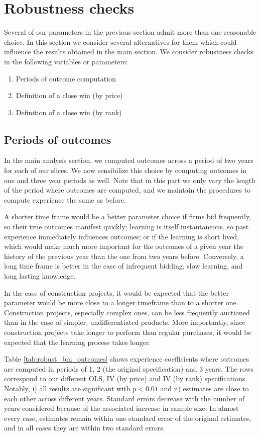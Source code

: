 \section{Robustness checks}
Several of our parameters in the previous section admit more than one reasonable choice. In this section we consider several alternatives for them which could influence the results obtained in the main section. We consider robustness checks in the following variables or parameters:
\begin{enumerate}
  \item Periods of outcome computation
  \item Definition of a close win (by price)
  \item Definition of a close win (by rank)
\end{enumerate}
\subsection{Periods of outcomes}
In the main analysis section, we computed outcomes across a period of two years for each of our slices. We now sensibilize this choice by computing outcomes in one and three year periods as well. Note that in this part we only vary the length of the period where outcomes are computed, and we maintain the procedures to compute experience the same as before.

 A shorter time frame would be a better parameter choice if firms bid frequently, so their true outcomes manifest quickly;  learning is itself instantaneous,  so past experience immediately influences outcomes; or if the learning is short lived, which would make much more important for the outcomes of a given year the history of the previous year than the one from two years before. Conversely, a long time frame is better in the case of infrequent bidding, slow learning, and long lasting knowledge.

In the case of construction projects, it would be expected that the better parameter would be more close to a longer timeframe than to a shorter one. Construction projects, especially complex ones, can be less frequently auctioned than in the case of simpler, undifferentiated products. More importantly, since construction projects take longer to perform than regular purchases, it would be expected that the learning process takes longer.

Table \ref{tab:robust_bin_outcomes} shows experience coefficients where outcomes are computed in periods of 1, 2 (the original specification) and 3 years. The rows correspond to our different OLS, IV (by price) and IV (by rank) specifications. Notably, i) all results are significant with $p<0.01$ and ii) estimates are close to each other across different years. Standard errors decrease with the number of years considered because of the associated increase in sample size. In almost every case, estimates remain within one standard error of the original estimates, and in all cases they are within two standard errors.


